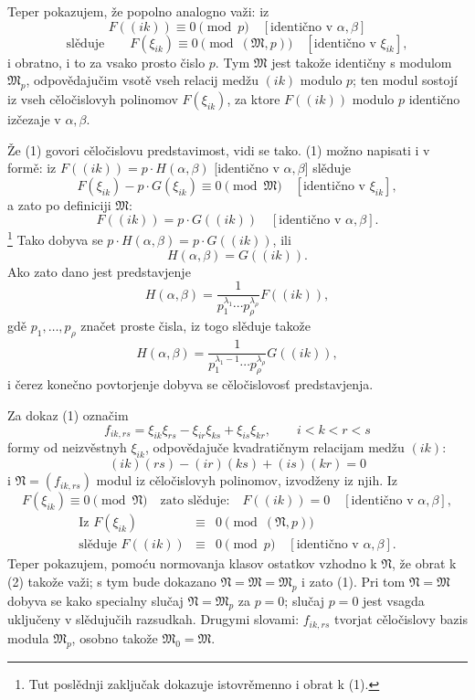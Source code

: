\documentclass[11pt]{article}
\providecommand{\frM}{\mathfrak M}
\providecommand{\frN}{\mathfrak N}
\begin{document}
Teper pokazujem, že popolno analogno važi: iz
\[
        F((ik))\equiv0\pmod p\quad [\text{identično v \(\alpha,\beta\)}]
\]
\begin{equation}
        \text{slěduje}\qquad
        F(\xi_{ik})\equiv0\pmod{(\frM,p)}\quad [\text{identično v \(\xi_{ik}\)}],
\end{equation}
i obratno, i to za vsako prosto čislo \(p\). Tym \(\frM\) jest takože identičny s modulom \(\frM_p\), odpovědajučim vsotě vseh relacij medžu \((ik)\) modulo \(p\); ten modul sostojí iz vseh cěločislovyh polinomov \(F(\xi_{ik})\), za ktore \(F((ik))\) modulo \(p\) identično izčezaje v \(\alpha,\beta\).

Že (1) govori cěločislovu predstavimost, vidi se tako. (1) možno napisati i v formě: iz \(F((ik))=p\cdot H(\alpha,\beta)\) [identično v \(\alpha,\beta\)] slěduje
\[
        F(\xi_{ik})-p\cdot G(\xi_{ik})\equiv0\pmod{\frM}
        \quad [\text{identično v \(\xi_{ik}\)}],
\]
a zato po definiciji \(\frM\):
\[
        F((ik))=p\cdot G((ik))\quad [\text{identično v \(\alpha,\beta\)}].
\]
\footnote{Tut poslědnji zaključak dokazuje istovrěmenno i obrat k (1).}
Tako dobyva se \(p\cdot H(\alpha,\beta)=p\cdot G((ik))\), ili
\[
        H(\alpha,\beta)=G((ik)).
\]
Ako zato dano jest predstavjenje
\[
        H(\alpha,\beta)
        =
        \frac1{p_1^{\lambda_1}\cdots p_\rho^{\lambda_\rho}}
        F((ik)),
\]
gdě \(p_1,\ldots,p_\rho\) značet proste čisla, iz togo slěduje takože
\[
        H(\alpha,\beta)
        =
        \frac1{p_1^{\lambda_1-1}\cdots p_\rho^{\lambda_\rho}}
        G((ik)),
\]
i čerez konečno povtorjenje dobyva se cěločislovosť predstavjenja.

Za dokaz (1) označim
\[
        f_{ik,rs}=\xi_{ik}\xi_{rs}-\xi_{ir}\xi_{ks}+\xi_{is}\xi_{kr},
        \qquad i<k<r<s
\]
formy od neizvěstnyh \(\xi_{ik}\), odpovědajuče kvadratičnym relacijam medžu \((ik)\):
\[
        (ik)(rs)-(ir)(ks)+(is)(kr)=0
\]
i \(\frN=(f_{ik,rs})\) modul iz cěločislovyh polinomov, izvodženy iz njih. Iz
\[
        F(\xi_{ik})\equiv0\pmod{\frN}
        \quad\text{zato slěduje:}\quad
        F((ik))=0\quad [\text{identično v \(\alpha,\beta\)}],
\]
\begin{equation}
\begin{array}{rcl}
        \text{Iz }F(\xi_{ik})&\equiv&0\pmod{(\frN,p)}\\
        \text{slěduje }F((ik))&\equiv&0\pmod p\quad[\text{identično v \(\alpha,\beta\)}].
\end{array}
\end{equation}
Teper pokazujem, pomoću normovanja klasov ostatkov vzhodno k \(\frN\), že obrat k (2) takože važi; s tym bude dokazano \(\frN=\frM=\frM_p\) i zato (1). Pri tom \(\frN=\frM\) dobyva se kako specialny slučaj \(\frN=\frM_p\) za \(p=0\); slučaj \(p=0\) jest vsagda uključeny v slědujučih razsudkah. Drugymi slovami: \(f_{ik,rs}\) tvorjat cěločislovy bazis modula \(\frM_p\), osobno takože \(\frM_0=\frM\).
\end{document}
